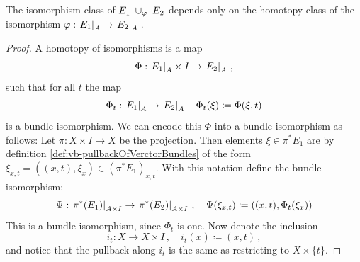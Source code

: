 \begin{lemma}
	\label{lem:kTheo-homotopyInvarianceClutchingFunction}
	The isomorphism class of $E_1\;\cup_{\varphi} \; E_2$ depends only on the homotopy class of the isomorphism $\varphi:\left.E_1\right|_{A}\to \left.E_2\right|_{A}$\,.
	\end{lemma}
\begin{proof}
	A homotopy of isomorphisms is a map 
\begin{equation*}
	\Phi: \left.E_1\right|_{A} \times I\to \left.E_2\right|_{A}\,,
\end{equation*} such that for all $t$ the map 
\begin{equation*}
	\Phi_t: \left.E_1\right|_{A} \to \left.E_2\right|_{A}\quad \Phi_t(\xi)\coloneq \Phi(\xi,t)
\end{equation*} is a bundle isomorphism. We can encode this $\Phi$ into a bundle isomorphism as follows: Let $\pi: X\times I\to X$ be the projection. Then elements $\xi\in \pi^*E_1$ are by definition \ref{def:vb-pullbackOfVerctorBundles} of the form $\xi_{x,t}=((x,t),\xi_x)\in (\pi^*E_1)_{x,t}$. With this notation define the bundle isomorphism: 
\begin{equation*}
	\Psi: \left.\pi^*(E_1)\right|_{A\times I} \to   \left.\pi^*(E_2)\right|_{A\times I}\,,\quad 	\Psi(\xi_{x,t})\coloneq ((x,t),\Phi_t( \xi_x))
\end{equation*}
This is a bundle isomorphism, since $\Phi_t$ is one. Now denote the inclusion 
\begin{equation*}
	i_t: X \to X \times I\,,\quad i_t(x)\coloneq (x,t)\,,
\end{equation*}and notice that the pullback along $i_t$ is the same as restricting to $X\times\{t\}$. 


\end{proof}

